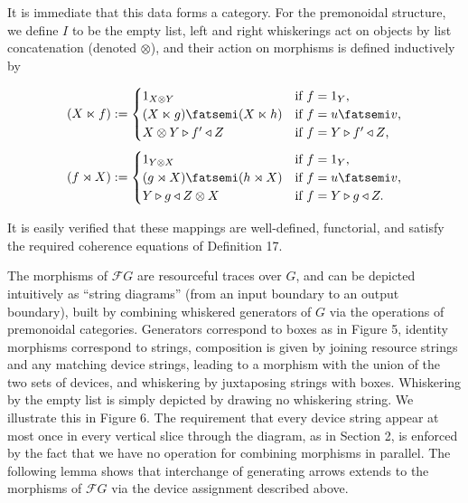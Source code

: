 \documentclass[10pt,a4paper]{article}
\begin{document}
It is immediate that this data forms a category. For the premonoidal structure, we define $I$ to be the empty list, left and right whiskerings act on objects by list concatenation (denoted $\otimes$), and their action on morphisms is defined inductively by\par
    \[(X\ltimes f):=\begin{cases}1_{X\otimes Y}&\text{if $f=1_{Y}$,}\\
(X\ltimes g){\mathop{\fatsemi}}(X\ltimes h)&\text{if $f=u{\mathop{\fatsemi}}v$,}\\
X\otimes Y\triangleright f^{\prime}\triangleleft Z&\text{if $f=Y\triangleright
f^{\prime}\triangleleft Z$,}\end{cases}\]       \[(f\rtimes X):=\begin{cases}1_{Y\otimes X}&\text{if $f=1_{Y}$,}\\
(g\rtimes X){\mathop{\fatsemi}}(h\rtimes X)&\text{if $f=u{\mathop{\fatsemi}}v$,}\\
Y\triangleright g\triangleleft Z\otimes X&\text{if $f=Y\triangleright g\triangleleft Z.$}\end{cases}\]    
 
 
It is easily verified that these mappings are well-defined, functorial, and satisfy the required coherence equations of Definition 17.\par
 
 
 
 
The morphisms of $\mathcal{F}G$ are resourceful traces over $G$, and can be depicted intuitively as “string diagrams” (from an input boundary to an output boundary), built by combining whiskered generators of $G$ via the operations of premonoidal categories. Generators correspond to boxes as in Figure 5, identity morphisms correspond to strings, composition is given by joining resource strings and any matching device strings, leading to a morphism with the union of the two sets of devices, and whiskering by juxtaposing strings with boxes. Whiskering by the empty list is simply depicted by drawing no whiskering string. We illustrate this in Figure 6. The requirement that every device string appear at most once in every vertical slice through the diagram, as in Section 2, is enforced by the fact that we have no operation for combining morphisms in parallel. The following lemma shows that interchange of generating arrows extends to the morphisms of $\mathcal{F}G$ via the device assignment described above.\par
 
\end{document}
